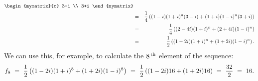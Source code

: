 \begin{solution}
\begin{eqnarray*}
        \begin{mymatrix}{c} 3-i \\ 3+i \end{mymatrix} \\
    &=& \frac{1}{4}\paren{(1-i)(1+i)^n(3-i) + (1+i)(1-i)^n(3+i)} \\
    &=& \frac{1}{4}\paren{(2-4i)(1+i)^n + (2+4i)(1-i)^n} \\
    &=& \frac{1}{2}\paren{(1-2i)(1+i)^n + (1+2i)(1-i)^n}.
  \end{eqnarray*}
  We can use this, for example, to calculate the $8^{\,\rm th}$ element of the
  sequence:
  \begin{equation*}
    f_{8}
    ~=~ \frac{1}{2}\left((1-2i)(1+i)^8 + (1+2i)(1-i)^8\right)
    ~=~ \frac{1}{2}\left((1-2i)16 + (1+2i)16\right)
    ~=~ \frac{32}{2}
    ~=~ 16.
  \end{equation*}

\end{solution}
